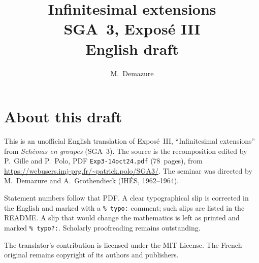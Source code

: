\documentclass[11pt,a4paper,oneside]{amsbook}
\title[SGA~3, Expos\'e III (English draft)]{Infinitesimal extensions\\
{\normalsize SGA~3, Expos\'e III\\English draft}}
\author{M.\ Demazure}
\date{}
\begin{document}
\frontmatter
\maketitle

\chapter*{About this draft}
This is an unofficial English translation of Expos\'e~III, ``Infinitesimal extensions''
from \textit{Sch\'emas en groupes} (SGA~3).
The source is the recomposition edited by P.~Gille and P.~Polo,
PDF \texttt{Exp3-14oct24.pdf} (78~pages),
from \url{https://webusers.imj-prg.fr/~patrick.polo/SGA3/}.
The seminar was directed by M.~Demazure and A.~Grothendieck
(IH\'ES, 1962--1964).

Statement numbers follow that PDF. A clear typographical slip is
corrected in the English and marked with a \texttt{\% typo:} comment;
such slips are listed in the README. A slip that would change the
mathematics is left as printed and marked \texttt{\% typo?:}.
Scholarly proofreading remains outstanding.

The translator's contribution is licensed under the MIT License.
The French original remains copyright of its authors and publishers.

\tableofcontents
\mainmatter











\end{document}
